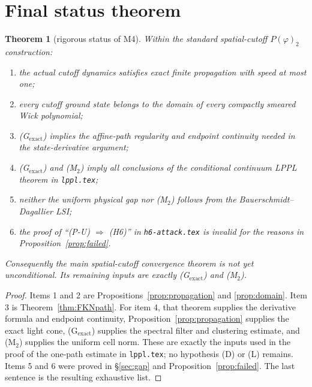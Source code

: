 \documentclass[11pt,a4paper]{article}
\newtheorem{theorem}{Theorem}[section]
\theoremstyle{remark}
\begin{document}
\section{Final status theorem}

\begin{theorem}[rigorous status of M4]\label{thm:status}
Within the standard spatial-cutoff $P(\varphi)_2$ construction:
\begin{enumerate}
\item the actual cutoff dynamics satisfies exact finite propagation with speed at most one;
\item every cutoff ground state belongs to the domain of every compactly smeared Wick polynomial;
\item (G$_\mathrm{exact}$) implies the affine-path regularity and endpoint continuity needed in
the state-derivative argument;
\item (G$_\mathrm{exact}$) and (M$_2$) imply all conclusions of the conditional continuum LPPL
theorem in \texttt{lppl.tex};
\item neither the uniform physical gap nor (M$_2$) follows from the Bauerschmidt--Dagallier LSI;
\item the proof of ``(P-U) $\Rightarrow$ (H6)'' in \texttt{h6-attack.tex} is invalid for the
reasons in Proposition~\ref{prop:failed}.
\end{enumerate}
Consequently the main spatial-cutoff convergence theorem is not yet unconditional.  Its remaining
inputs are exactly (G$_\mathrm{exact}$) and (M$_2$).
\end{theorem}

\begin{proof}
Items 1 and 2 are Propositions~\ref{prop:propagation} and \ref{prop:domain}.  Item 3 is
Theorem~\ref{thm:FKNpath}.  For item 4, that theorem supplies the derivative formula and endpoint
continuity, Proposition~\ref{prop:propagation} supplies the exact light cone,
(G$_\mathrm{exact}$) supplies the spectral filter and clustering estimate, and (M$_2$) supplies
the uniform cell norm.  These are exactly the inputs used in the proof of the one-path estimate in
\texttt{lppl.tex}; no hypothesis (D) or (L) remains.  Items 5 and 6 were proved in
\S\ref{sec:gap} and Proposition~\ref{prop:failed}.  The last sentence is the resulting exhaustive
list.
\end{proof}
\end{document}
